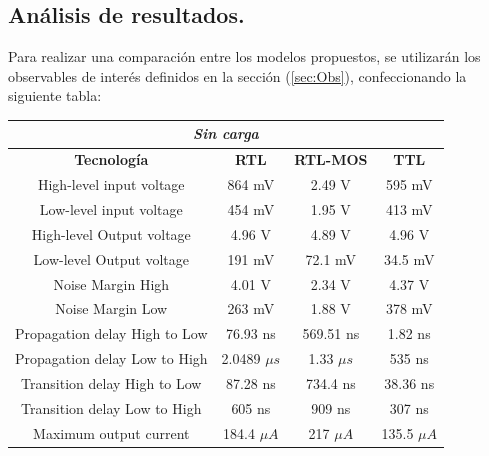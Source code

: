 \subsection{Análisis de resultados.}
Para realizar una comparación entre los modelos propuestos, se utilizarán los observables de interés definidos en la sección (\ref{sec:Obs}), confeccionando la siguiente tabla:
\begin{table}[H]
\centering
\begin{tabular}{c|ccc}
\hline
\multicolumn{4}{|c|}{\textit{Sin carga}}                                                                          \\ \hline
\multicolumn{1}{|c|}{\textbf{Tecnología}} & \textbf{RTL}   & \textbf{RTL-MOS} & \multicolumn{1}{c|}{\textbf{TTL}} \\ \hline
High-level input voltage                  & 864 mV         & 2.49 V           & 595 mV                            \\
Low-level input voltage                   & 454 mV         & 1.95 V           & 413 mV                            \\
High-level Output voltage                 & 4.96 V         & 4.89 V           & 4.96 V                            \\
Low-level Output voltage                  & 191 mV         & 72.1 mV          & 34.5 mV                            \\
Noise Margin High                         & 4.01 V         & 2.34 V           & 4.37 V                            \\
Noise Margin Low                          & 263 mV         & 1.88 V           & 378 mV                            \\
Propagation delay High to Low             & 76.93 ns       & 569.51 ns        & 1.82 ns                           \\
Propagation delay Low to High             & 2.0489 $\mu s$ & 1.33 $\mu s$     & 535 ns                            \\
Transition delay High to Low              & 87.28 ns       & 734.4 ns         & 38.36 ns                          \\
Transition delay Low to High              & 605 ns         & 909 ns           & 307 ns                            \\
Maximum output current                    & 184.4  $\mu A$ &    217 $\mu A$              &                                  135.5 $\mu A$ 	\\
\hline
\end{tabular}
\end{table}
